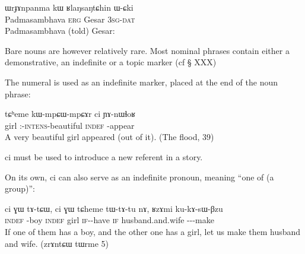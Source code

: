   \begin{exe}
\ex
\gll  ɯrɟɤnpanma 	kɯ 	ʁlaŋsaŋtɕhin 	ɯ-ɕki  \\
 Padmasambhava \textsc{erg} Gesar \textsc{3sg}-\textsc{dat} \\
\glt Padmasambhava (told) Gesar:
\end{exe}

Bare nouns are however relatively rare. Most nominal phrases contain either a demonstrative, an indefinite or a topic marker (cf § XXX)


The numeral  is used as an indefinite marker, placed at the end of the noun phrase:

\begin{exe}
\ex
\gll tɕʰeme kɯ-mpɕɯ-mpɕɤr 	ci 	ɲɤ-nɯɬoʁ \\
girl \nmlz{}:\stat{}-\textsc{intens}-beautiful \textsc{indef}  \evd{}-appear \\
\glt A very beautiful girl appeared (out of it). (The flood, 39)
\end{exe}
ci must be used to introduce a new referent in a story.

On its own, ci can also serve as an indefinite pronoun, meaning ``one of (a group)'':
  \begin{exe}
\ex
\gll ci 	ɣɯ 	tɤ-tɕɯ, 	ci 	ɣɯ 	tɕheme 	tɯ-tɤ-tu 	nɤ, 	ʁzɤmi 	ku-kɤ-sɯ-βzu \\
\textsc{indef} \gen{} \neu{}-boy \textsc{indef} \gen{} girl \textsc{if}-\aor{}-have \textsc{if} husband.and.wife \ipf{}-\inftv{}-\caus{}-make \\
\glt If one of them has a boy, and the other one has a girl, let us make them husband and wife. (zrɤntɕɯ tɯrme 5)
\end{exe}


